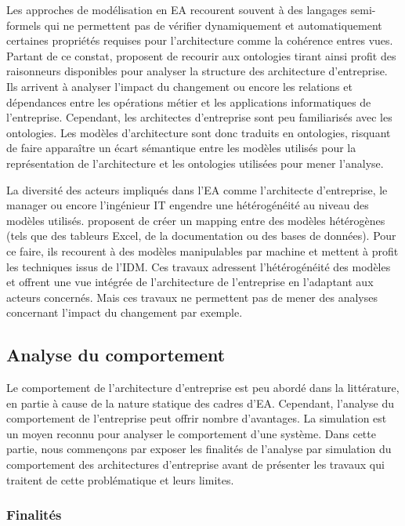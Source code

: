Les approches de modélisation en EA recourent souvent à des langages
semi-formels qui ne permettent pas de vérifier dynamiquement et automatiquement
certaines propriétés requises pour l'architecture comme la cohérence entres
vues. Partant de ce constat, \cite{sunkle_analyzing_2013} proposent de recourir
aux ontologies tirant ainsi profit des raisonneurs disponibles pour analyser la
structure des architecture d'entreprise. Ils arrivent à analyser l'impact du
changement ou encore les relations et dépendances entre les opérations métier
et les applications informatiques de l'entreprise. Cependant, les architectes
d'entreprise sont peu familiarisés avec les ontologies. Les modèles
d'architecture sont donc traduits en ontologies, risquant de faire
apparaître un écart sémantique entre les modèles utilisés pour la représentation
de l'architecture et les ontologies utilisées pour mener l'analyse.
	
La diversité des acteurs impliqués dans l'EA comme l'architecte d'entreprise,
le manager ou encore l'ingénieur IT engendre une hétérogénéité au niveau des
modèles utilisés. \cite{bruneliere2013support} proposent de créer un mapping
entre des modèles hétérogènes (tels que des tableurs Excel, de la documentation
ou des bases de données). Pour ce faire, ils recourent à des modèles manipulables par machine et mettent à profit les techniques issus de l'IDM. Ces
travaux adressent l'hétérogénéité des modèles et offrent une vue intégrée
de l'architecture de l'entreprise en l'adaptant aux acteurs concernés. Mais ces 
travaux ne permettent pas de mener des analyses concernant l'impact du changement par exemple. 

	
\subsection{Analyse du comportement}

Le comportement de l'architecture d'entreprise est peu abordé dans la littérature,
en partie à cause de la nature statique des cadres d'EA. Cependant, l'analyse du
comportement de l'entreprise peut offrir nombre d'avantages. La simulation est un moyen
reconnu pour analyser le comportement d'une système. Dans cette partie, nous
commençons par exposer les finalités de l'analyse par simulation du comportement des
architectures d'entreprise avant de présenter les travaux qui traitent de cette problématique
et leurs limites.


\subsubsection{Finalités}

